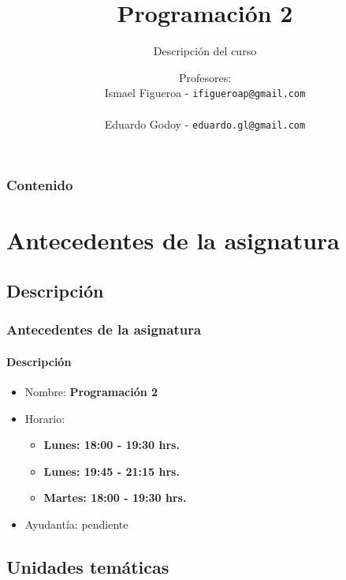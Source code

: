 \documentclass{beamer}
\title[\textbf{Programaci\'on 2}]{\textbf{Programaci\'on 2}}
\subtitle{Descripci\'on del curso}
\author[IF-EG]
{Profesores:\\
	Ismael Figueroa -  \texttt{\small ifigueroap@gmail.com} \\
	\vspace{0.5mm}
	 \\
	 Eduardo Godoy - \texttt{\small eduardo.gl@gmail.com} \\
}
\institute[Universidad de Valpara\'iso]
\begin{document}
	\begin{frame}
		\titlepage
	\end{frame}

	\begin{frame}
		\frametitle{Contenido}
		\tableofcontents%
	\end{frame}

	\section{Antecedentes de la asignatura}

		\subsection{Descripci\'on}

		\begin{frame}
			\frametitle{Antecedentes de la asignatura}
			\framesubtitle{Descripci\'on}

			\begin{itemize}
				\item Nombre: \textbf{Programaci\'on 2}
				\item Horario:
				\begin{itemize}
					\item \textbf{Lunes: 18:00 - 19:30 hrs.}
					\item \textbf{Lunes: 19:45 - 21:15 hrs.}
					\item \textbf{Martes: 18:00 - 19:30 hrs.}
				\end{itemize}
				\item Ayudant\'ia: pendiente
			\end{itemize}
		\end{frame}

		\subsection{Unidades tem\'aticas}
\end{document}
